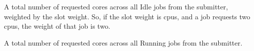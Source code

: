 \begin{description}
\item[\AdAttr{WeightedIdleJobs}:] A total number of requested
cores across all Idle jobs from the submitter, weighted
by the slot weight.  So, if the slot weight is cpus, and a job
requests two cpus, the weight of that job is two.

\item[\AdAttr{WeightedRunningJobs}:] A total number of requested
cores across all Running jobs from the submitter.

\end{description}

